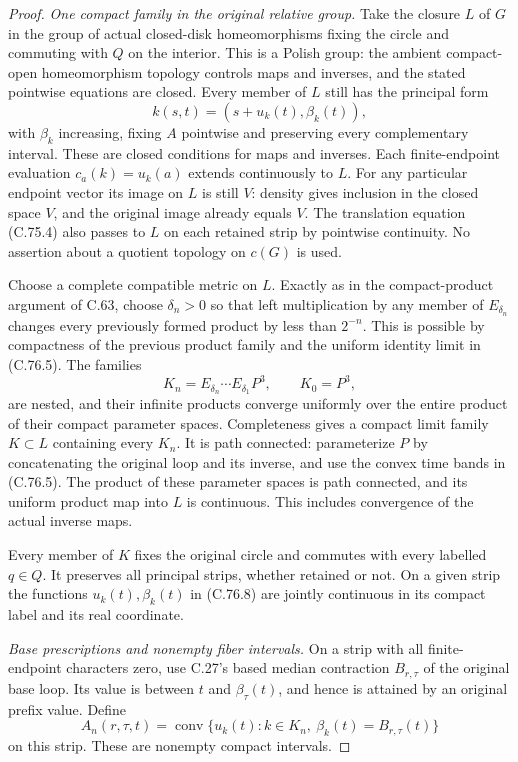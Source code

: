 \begin{proof}
\emph{One compact family in the original relative group.}
Take the closure $L$ of $G$ in the group of actual
closed-disk homeomorphisms fixing the circle and commuting
with $Q$ on the interior. This is a Polish group: the
ambient compact-open homeomorphism topology controls maps
and inverses, and the stated pointwise equations are closed.
Every member of $L$ still has the principal form
\[
                  k(s,t)=(s+u_k(t),\beta_k(t)),
                                                               \tag{C.76.8}
\]
with $\beta_k$ increasing, fixing $A$ pointwise and
preserving every complementary interval. These are closed
conditions for maps and inverses. Each finite-endpoint
evaluation $c_a(k)=u_k(a)$ extends continuously to $L$.
For any particular endpoint vector its image on $L$ is
still $V$: density gives inclusion in the closed space
$V$, and the original image already equals $V$.
The translation equation (C.75.4) also passes to $L$ on
each retained strip by pointwise continuity. No assertion
about a quotient topology on $c(G)$ is used.

Choose a complete compatible metric on $L$. Exactly as
in the compact-product argument of C.63, choose
$\delta_n>0$ so that left multiplication by any member of
$E_{\delta_n}$ changes every previously formed product
by less than $2^{-n}$. This is possible by compactness
of the previous product family and the uniform identity
limit in (C.76.5). The families
\[
       K_n=E_{\delta_n}\cdots E_{\delta_1}P^3,
                       \qquad K_0=P^3,
                                                               \tag{C.76.9}
\]
are nested, and their infinite products converge uniformly
over the entire product of their compact parameter spaces.
Completeness gives a compact limit family $K\subset L$
containing every $K_n$. It is path connected: parameterize
$P$ by concatenating the original loop and its inverse,
and use the convex time bands in (C.76.5). The product
of these parameter spaces is path connected, and its
uniform product map into $L$ is continuous.
This includes convergence of the actual inverse maps.

Every member of $K$ fixes the original circle and commutes
with every labelled $q\in Q$. It preserves all principal
strips, whether retained or not. On a given strip the
functions $u_k(t),\beta_k(t)$ in (C.76.8) are jointly
continuous in its compact label and its real coordinate.

\emph{Base prescriptions and nonempty fiber intervals.}
On a strip with all finite-endpoint characters zero, use
C.27's based median contraction $B_{r,\tau}$ of the
original base loop. Its value is between $t$ and
$\beta_\tau(t)$, and hence is attained by an original
prefix value. Define
\[
 A_n(r,\tau,t)=\operatorname{conv}
       \{u_k(t):k\in K_n,\ \beta_k(t)=B_{r,\tau}(t)\}
                                                               \tag{C.76.10}
\]
on this strip. These are nonempty compact intervals.


\end{proof}
